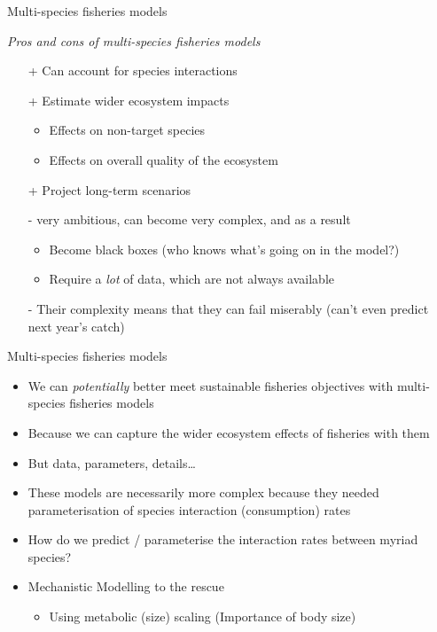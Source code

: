 \documentclass[xcolor={usenames,x11names},compress]{beamer}
\renewcommand{\(}{\begin{columns}}
\renewcommand{\)}{\end{columns}}
\newcommand{\<}[1]{\begin{column}{#1}}
\renewcommand{\>}{\end{column}}
\begin{document}
\begin{frame}{Multi-species fisheries models}

  \textit{Pros and cons of multi-species fisheries models}

  \begin{itemize} [<+->]\itemsep6pt
    \item[+] Can account for species interactions 

    \item[+] Estimate wider ecosystem impacts 
      \begin{itemize}
        \item Effects on non-target species
        \item Effects on overall quality of the ecosystem
      \end{itemize}
    \item[+] Project long-term scenarios

      \item[-] very ambitious, can become very complex, and as a result
      \begin{itemize}
	      \item Become black boxes (who knows what's going on in the model?)
	      \item Require a \textit{lot} of data, which are not always available
      \end{itemize}
      \item [-] Their complexity means that they can fail miserably (can't even predict next year's catch)
  \end{itemize}

\end{frame}

\begin{frame}{Multi-species fisheries models}

  \begin{itemize}[<+->]\itemsep10pt
    \item We can {\it potentially} better meet sustainable fisheries objectives with multi-species fisheries models
    \item Because we can capture the wider ecosystem effects of fisheries with them
    \item But data, parameters, details\ldots
    \item These models are necessarily more complex because they needed parameterisation of species interaction (consumption) rates
    \item How do we predict / parameterise the interaction rates between myriad species?
    \item Mechanistic Modelling to the rescue
    \begin{itemize}
      \item Using metabolic (size) scaling (Importance of body size)
    \end{itemize}
  \end{itemize}
  
  \end{frame}
\end{document}
